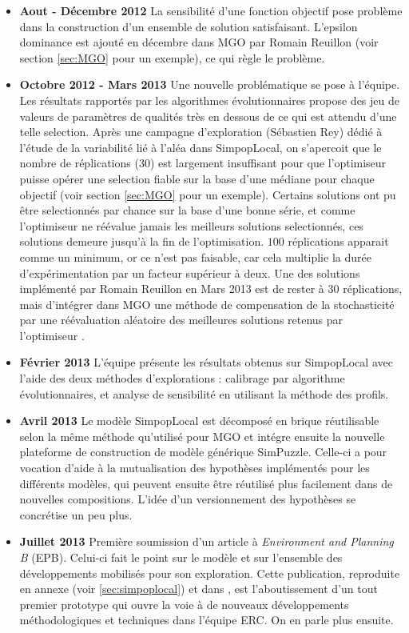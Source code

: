 \begin{itemize}[label=\textbullet]
\item {\textbf{Aout - Décembre 2012}} La sensibilité d'une fonction objectif pose problème dans la construction d'un ensemble de solution satisfaisant. L'epsilon dominance est ajouté en décembre dans MGO par Romain Reuillon (voir section \ref{sec:MGO} pour un exemple), ce qui règle le problème.

\item {\textbf{Octobre 2012 - Mars 2013}} Une nouvelle problématique se pose à l'équipe. Les résultats rapportés par les algorithmes évolutionnaires propose des jeu de valeurs de paramètres de qualités très en dessous de ce qui est attendu d'une telle selection. Après une campagne d'exploration (Sébastien Rey) dédié à l'étude de la variabilité lié à l'aléa dans SimpopLocal, on s'apercoit que le nombre de réplications ($30$) est largement insuffisant pour que l'optimiseur puisse opérer une selection fiable sur la base d'une médiane pour chaque objectif (voir section \ref{sec:MGO} pour un exemple). Certains solutions ont pu être selectionnés par chance sur la base d'une bonne série, et comme l'optimiseur ne réévalue jamais les meilleurs solutions selectionnés, ces solutions demeure jusqu'à la fin de l'optimisation. $100$ réplications apparait comme un minimum, or ce n'est pas faisable, car cela multiplie la durée d'expérimentation par un facteur supérieur à deux. Une des solutions implémenté par Romain Reuillon en Mars 2013 est de rester à $30$ réplications, mais d'intégrer dans MGO une méthode de compensation de la stochasticité par une réévaluation aléatoire des meilleures solutions retenus par l'optimiseur \autocite{Pietro2004}. 

\item {\textbf{Février 2013}} L'équipe présente les résultats obtenus sur SimpopLocal avec l'aide des deux méthodes d'explorations : calibrage par algorithme évolutionnaires, et analyse de sensibilité en utilisant la méthode des profils. 

\item {\textbf{Avril 2013}} Le modèle SimpopLocal est décomposé en brique réutilisable selon la même méthode qu'utilisé pour MGO et intégre ensuite la nouvelle plateforme de construction de modèle générique SimPuzzle. Celle-ci a pour vocation d'aide à la mutualisation des hypothèses implémentés pour les différents modèles, qui peuvent ensuite être réutilisé plus facilement dans de nouvelles compositions. L'idée d'un versionnement des hypothèses se concrétise un peu plus. 

\item {\textbf{Juillet 2013}} Première soumission d'un article à \textit{Environment and Planning B} (EPB). Celui-ci fait le point sur le modèle et sur l'ensemble des développements mobilisés pour son exploration. Cette publication, reproduite en annexe (voir \ref{sec:simpoplocal}) et dans \textcite{Schmitt2015}, est l'aboutissement d'un tout premier prototype qui ouvre la voie à de nouveaux développements méthodologiques et techniques dans l'équipe ERC. On en parle plus ensuite.

\end{itemize}


